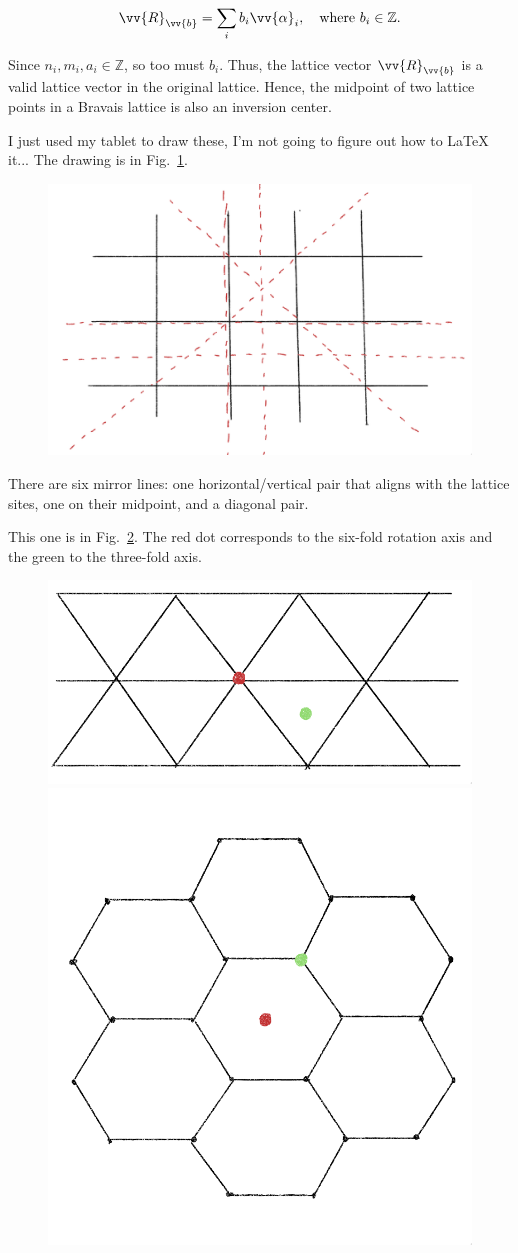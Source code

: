 \begin{parts}
  \begin{equation}
    \vv{R}_{\vv{b}} = \sum_i b_i \vv{\alpha}_i, \quad\text{where}\ b_i \in \mathbb{Z}.
  \end{equation}

  Since $n_i,m_i,a_i \in \mathbb{Z}$, so too must $b_i$. Thus, the lattice vector $\vv{R}_{\vv{b}}$ is a valid lattice vector in the original lattice. Hence, the midpoint of two lattice points in a Bravais lattice is also an inversion center.


\item I just used my tablet to draw these, I'm not going to figure out how to LaTeX it... The drawing is in Fig.~\ref{fig:3-1-b}.

  \begin{figure}[]
    \centering
    \includegraphics[width=0.6\linewidth]{./res/Pics/3_1_b.png}
    \caption{}\label{fig:3-1-b}
  \end{figure}

  There are six mirror lines: one horizontal/vertical pair that aligns with the lattice sites, one on their midpoint, and a diagonal pair.


\item This one is in Fig.~\ref{fig:3-1-c-1}. The red dot corresponds to the six-fold rotation axis and the green to the three-fold axis.

  \begin{figure}[]
    \centering
    \includegraphics[width=0.45\linewidth]{./res/Pics/3_1_c_11.png}
    \includegraphics[width=0.45\linewidth]{./res/Pics/3_1_c_12.png}
    \caption{}\label{fig:3-1-c-1}
  \end{figure}


\end{parts}
